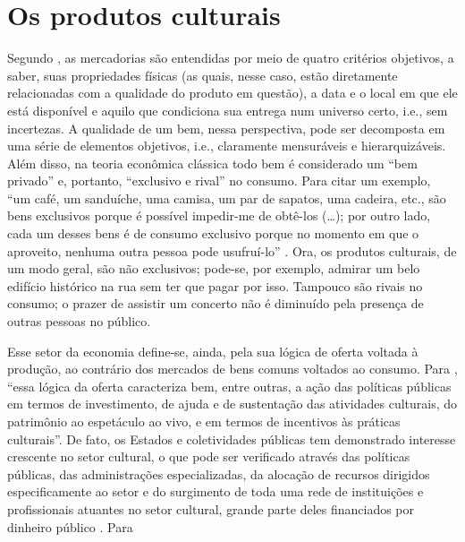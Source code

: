 \documentclass[a4paper, 12pt, openright, oneside, german, french, english, brazil]{abntex2}
\begin{document}
	
	
	\chapter{Os produtos culturais}
	
	Segundo , as mercadorias são entendidas por meio de quatro critérios objetivos, a saber, suas propriedades físicas (as quais, nesse caso, estão diretamente relacionadas com a qualidade do produto em questão), a data e o local em que ele está disponível e aquilo que condiciona sua entrega num universo certo, i.e., sem incertezas. A qualidade de um bem, nessa perspectiva, pode ser decomposta em uma série de elementos objetivos, i.e., claramente mensuráveis e hierarquizáveis. Além disso, na teoria econômica clássica todo bem é considerado um ``bem privado'' e, portanto, ``exclusivo e rival'' no consumo. Para citar um exemplo, ``um café, um sanduíche, uma camisa, um par de sapatos, uma cadeira, etc., são bens exclusivos porque é possível impedir-me de obtê-los (\ldots); por outro lado, cada um desses bens é de consumo exclusivo porque no momento em que o aproveito, nenhuma outra pessoa pode usufruí-lo'' \cite[p. 29]{tolila2007cultura}. Ora, os produtos culturais, de um modo geral, são não exclusivos; pode-se, por exemplo, admirar um belo edifício histórico na rua sem ter que pagar por isso. Tampouco são rivais no consumo; o prazer de assistir um concerto não é diminuído pela presença de outras pessoas no público.
	
	Esse setor da economia define-se, ainda, pela sua lógica de oferta voltada à produção, ao contrário dos mercados de bens comuns voltados ao consumo. Para , ``essa lógica da oferta caracteriza bem, entre outras, a ação das políticas públicas em termos de investimento, de ajuda e de sustentação das atividades culturais, do patrimônio ao espetáculo ao vivo, e em termos de incentivos às práticas culturais''. De fato, os Estados e coletividades públicas tem demonstrado interesse crescente no setor cultural, o que pode ser verificado através das políticas públicas, das administrações especializadas, da alocação de recursos dirigidos especificamente ao setor e do surgimento de toda uma rede de instituições e profissionais atuantes no setor cultural, grande parte deles financiados por dinheiro público \cite{tolila2007cultura}. Para 
	
\end{document}
